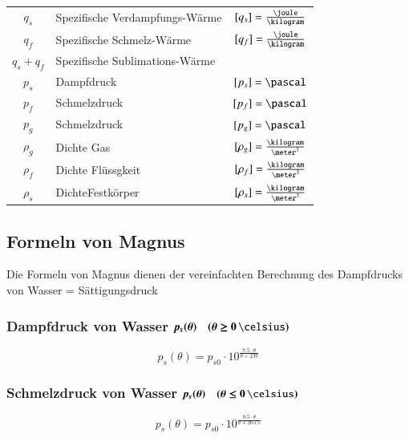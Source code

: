 \renewcommand{\arraystretch}{1.3}
\begin{tabular}{c l c}	
	$q_s$ 		& Spezifische Verdampfungs-Wärme 	& $[q_s] = \frac{\joule}{\kilogram}$		\\
	$q_f$ 		& Spezifische Schmelz-Wärme 		& $[q_f] = \frac{\joule}{\kilogram}$ 		\\
	$q_s + q_f$ & Spezifische Sublimations-Wärme 	&	 										\\
	$p_s$ 		& Dampfdruck 						& $[p_s] = \pascal$ 						\\
	$p_f$ 		& Schmelzdruck 						& $[p_f] = \pascal$ 						\\
	$p_g$ 		& Schmelzdruck 						& $[p_g] = \pascal$ 						\\
	$\rho_g$ 	& Dichte Gas 						& $[\rho_g] = \frac{\kilogram}{\meter^3}$	\\
	$\rho_f$ 	& Dichte Flüssgkeit 				& $[\rho_f] = \frac{\kilogram}{\meter^3}$	\\
	$\rho_s$ 	& DichteFestkörper 					& $[\rho_s] = \frac{\kilogram}{\meter^3}$	
\end{tabular}
\renewcommand{\arraystretch}{1}


\subsection{Formeln von Magnus}

Die Formeln von Magnus dienen der vereinfachten Berechnung des Dampfdrucks von Wasser = Sättigungsdruck 

\subsubsection{Dampfdruck von Wasser $\boldsymbol{p_s(\theta) \quad (\theta \geq 0 \, \celsius)}$}

\vspace{-0.2cm}

$$ \boxed{ p_s(\theta) = p_{s0} \cdot 10^{ \frac{7.5 \cdot \theta}{\theta + 237} } } $$



\subsubsection{Schmelzdruck von Wasser $\bm{p_s(\theta) \quad (\theta \leq 0 \, \celsius)}$}

\vspace{-0.2cm}

$$ \boxed{ p_s(\theta) = p_{s0} \cdot 10^{ \frac{9.5 \cdot \theta}{\theta + 265.5} } } $$


